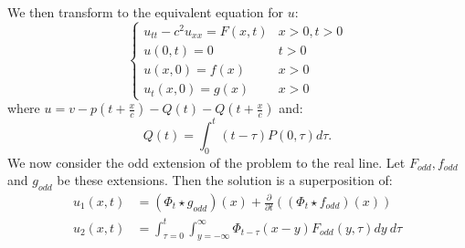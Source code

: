 \documentclass[../Main.tex]{subfiles}
\begin{document}
We then transform to the equivalent equation for $u$:
\begin{equation*}
    \begin{cases}
        u_{tt} - c^2 u_{xx} = F(x, t) & x > 0, t > 0 \\
        u(0, t) = 0 & t > 0 \\
        u(x, 0) = f(x) & x > 0 \\
        u_t(x, 0) = g(x) & x > 0
    \end{cases}
\end{equation*}
where $u = v - p\left(t + \frac{x}{c}\right) - Q(t) - Q\left(t + \frac{x}{c}\right)$ and:
\begin{equation*}
    Q(t) = \int_{0}^{t} (t - \tau) P(0, \tau) d\tau.
\end{equation*}
We now consider the odd extension of the problem to the real line. Let $F_{odd}, f_{odd}$ and $g_{odd}$ be these extensions. Then the solution is a superposition of:
\begin{align*}
    u_1(x, t) &= (\Phi_t \star g_{odd})(x) + \frac{\partial}{\partial t} ((\Phi_t \star f_{odd})(x)) \\
    u_2(x, t) &= \int_{\tau = 0}^t \int_{y = -\infty}^\infty \Phi_{t - \tau}(x - y) F_{odd}(y, \tau) dy~d\tau
\end{align*}
\end{document}
